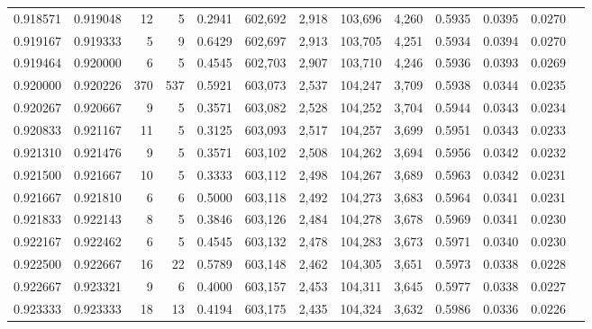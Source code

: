 \begin{tabular}{rrrrrrrrrrrrr}
0.918571 & 0.919048 &    12 &   5 &                                     0.2941 & 602,692 &   2,918 & 103,696 &   4,260 & 0.5935 & 0.0395 & 0.0270 \\
0.919167 & 0.919333 &     5 &   9 &                                     0.6429 & 602,697 &   2,913 & 103,705 &   4,251 & 0.5934 & 0.0394 & 0.0270 \\
0.919464 & 0.920000 &     6 &   5 &                                     0.4545 & 602,703 &   2,907 & 103,710 &   4,246 & 0.5936 & 0.0393 & 0.0269 \\
0.920000 & 0.920226 &   370 & 537 &                                     0.5921 & 603,073 &   2,537 & 104,247 &   3,709 & 0.5938 & 0.0344 & 0.0235 \\
0.920267 & 0.920667 &     9 &   5 &                                     0.3571 & 603,082 &   2,528 & 104,252 &   3,704 & 0.5944 & 0.0343 & 0.0234 \\
0.920833 & 0.921167 &    11 &   5 &                                     0.3125 & 603,093 &   2,517 & 104,257 &   3,699 & 0.5951 & 0.0343 & 0.0233 \\
0.921310 & 0.921476 &     9 &   5 &                                     0.3571 & 603,102 &   2,508 & 104,262 &   3,694 & 0.5956 & 0.0342 & 0.0232 \\
0.921500 & 0.921667 &    10 &   5 &                                     0.3333 & 603,112 &   2,498 & 104,267 &   3,689 & 0.5963 & 0.0342 & 0.0231 \\
0.921667 & 0.921810 &     6 &   6 &                                     0.5000 & 603,118 &   2,492 & 104,273 &   3,683 & 0.5964 & 0.0341 & 0.0231 \\
0.921833 & 0.922143 &     8 &   5 &                                     0.3846 & 603,126 &   2,484 & 104,278 &   3,678 & 0.5969 & 0.0341 & 0.0230 \\
0.922167 & 0.922462 &     6 &   5 &                                     0.4545 & 603,132 &   2,478 & 104,283 &   3,673 & 0.5971 & 0.0340 & 0.0230 \\
0.922500 & 0.922667 &    16 &  22 &                                     0.5789 & 603,148 &   2,462 & 104,305 &   3,651 & 0.5973 & 0.0338 & 0.0228 \\
0.922667 & 0.923321 &     9 &   6 &                                     0.4000 & 603,157 &   2,453 & 104,311 &   3,645 & 0.5977 & 0.0338 & 0.0227 \\
0.923333 & 0.923333 &    18 &  13 &                                     0.4194 & 603,175 &   2,435 & 104,324 &   3,632 & 0.5986 & 0.0336 & 0.0226 \\

\end{tabular}
